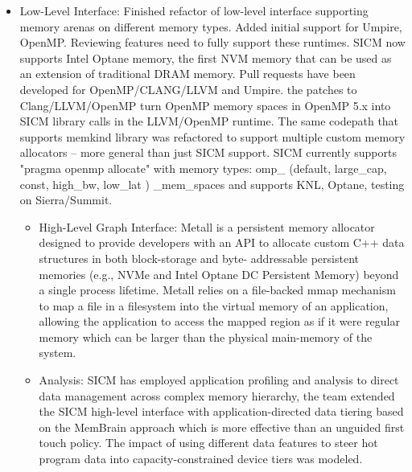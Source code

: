 \begin{itemize}
\item  Low-Level Interface: Finished refactor of low-level interface supporting memory arenas on different memory types. Added initial support for Umpire, OpenMP. Reviewing features need to fully support these runtimes. SICM now supports Intel Optane memory, the first NVM memory that can be used as an extension of traditional DRAM memory.
Pull requests have been developed for OpenMP/CLANG/LLVM and Umpire. the patches to Clang/LLVM/OpenMP turn OpenMP memory spaces in OpenMP 5.x into SICM library calls in the LLVM/OpenMP runtime. The same codepath that supports memkind library was refactored to support multiple custom memory allocators – more general than just SICM support.
SICM currently supports "pragma openmp allocate" with  memory types: omp_ (default, large_cap, const, high_bw, low_lat ) _mem_spaces and supports KNL, Optane, testing on Sierra/Summit.

\begin{itemize}
\item  High-Level Graph Interface: Metall is a persistent memory allocator designed to provide developers with an API to allocate custom C++ data structures in both block-storage and byte- addressable persistent memories (e.g., NVMe and Intel Optane DC Persistent Memory) beyond a single process lifetime. Metall relies on a file-backed mmap mechanism to map a file in a filesystem into the virtual memory of an application, allowing the application to access the mapped region as if it were regular memory which can be larger than the physical main-memory of the system.
\item Analysis: 
SICM has employed application profiling and analysis to direct data management across complex memory hierarchy, the team extended the SICM high-level interface with application-directed data tiering based on the MemBrain approach which is more effective than an unguided first touch policy.  The impact of using different data features to steer hot program data into capacity-constrained device tiers was modeled.
\end{itemize}

\end{itemize}
